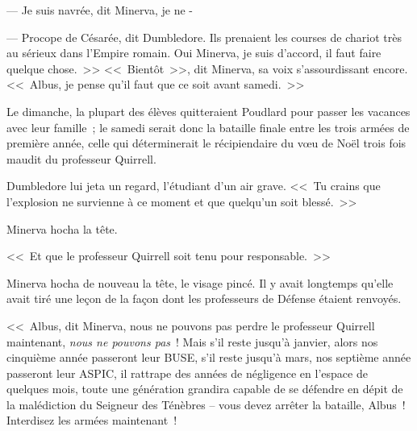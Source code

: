 --- Je suis navrée, dit Minerva, je ne -

--- Procope de Césarée\footnotemark{}, dit Dumbledore. Ils prenaient les courses de chariot très au sérieux dans l'Empire romain. Oui Minerva, je suis d'accord, il faut faire quelque chose.~>>
<<~Bientôt~>>, dit Minerva, sa voix s'assourdissant encore. <<~Albus, je pense qu'il faut que ce soit avant samedi.~>>

Le dimanche, la plupart des élèves quitteraient Poudlard pour passer les vacances avec leur famille~; le samedi serait donc la bataille finale entre les trois armées de première année, celle qui déterminerait le récipiendaire du vœu de Noël trois fois maudit du professeur Quirrell.

Dumbledore lui jeta un regard, l'étudiant d'un air grave. <<~Tu crains que l'explosion ne survienne à ce moment et que quelqu'un soit blessé.~>>

Minerva hocha la tête.

<<~Et que le professeur Quirrell soit tenu pour responsable.~>>

Minerva hocha de nouveau la tête, le visage pincé. Il y avait longtemps qu'elle avait tiré une leçon de la façon dont les professeurs de Défense étaient renvoyés.

<<~Albus, dit Minerva, nous ne pouvons pas perdre le professeur Quirrell maintenant, \emph{nous ne pouvons pas}~! Mais s'il reste jusqu'à janvier, alors nos cinquième année passeront leur BUSE, s'il reste jusqu'à mars, nos septième année passeront leur ASPIC, il rattrape des années de négligence en l'espace de quelques mois, toute une génération grandira capable de se défendre en dépit de la malédiction du Seigneur des Ténèbres -- vous devez arrêter la bataille, Albus~! Interdisez les armées maintenant~!

